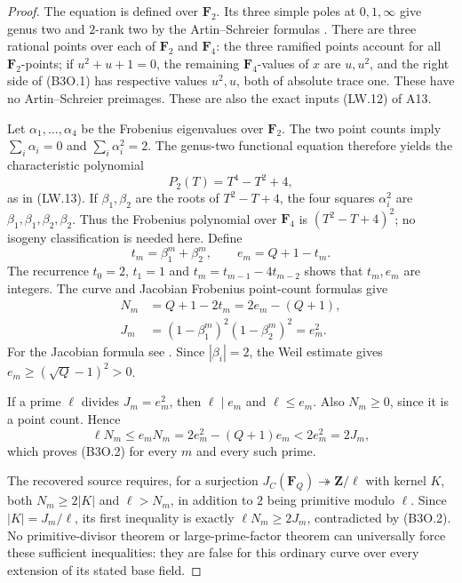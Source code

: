 \begin{proof}
The equation is defined over $\mathbf F_2$.  Its three simple
poles at $0,1,\infty$ give genus two and $2$-rank two by the
Artin--Schreier formulas \cite[Lemma~2.6]{PriesZhu2012}.
There are three rational points over each of $\mathbf F_2$
and $\mathbf F_4$: the three ramified points account for all
$\mathbf F_2$-points; if $u^2+u+1=0$, the remaining
$\mathbf F_4$-values of $x$ are $u,u^2$, and the right side
of (B3O.1) has respective values $u^2,u$, both of absolute
trace one.  These have no Artin--Schreier preimages.
These are also the exact inputs (LW.12) of A13.

Let $\alpha_1,\ldots,\alpha_4$ be the Frobenius eigenvalues
over $\mathbf F_2$.  The two point counts imply
$\sum_i\alpha_i=0$ and $\sum_i\alpha_i^2=2$.
The genus-two functional equation therefore yields the
characteristic polynomial
\[
                         P_2(T)=T^4-T^2+4,
 \tag{B3O.3}
\]
as in (LW.13).  If $\beta_1,\beta_2$ are the roots of
$T^2-T+4$, the four squares $\alpha_i^2$ are
$\beta_1,\beta_1,\beta_2,\beta_2$.
Thus the Frobenius polynomial over $\mathbf F_4$ is
$(T^2-T+4)^2$; no isogeny classification is needed here.
Define
\[
 t_m=\beta_1^m+\beta_2^m,\qquad e_m=Q+1-t_m.
 \tag{B3O.4}
\]
The recurrence $t_0=2$, $t_1=1$ and
$t_m=t_{m-1}-4t_{m-2}$ shows that $t_m,e_m$ are integers.
The curve and Jacobian Frobenius point-count formulas give
\[
 \begin{aligned}
 N_m&=Q+1-2t_m=2e_m-(Q+1),\\
 J_m&=(1-\beta_1^m)^2(1-\beta_2^m)^2=e_m^2.
 \end{aligned}
 \tag{B3O.5}
\]
For the Jacobian formula see
\cite[Theorem~19.1(b)]{MilneAV}.
Since $|\beta_i|=2$, the Weil estimate gives
$e_m\ge(\sqrt Q-1)^2>0$.

If a prime $\ell$ divides $J_m=e_m^2$, then
$\ell\mid e_m$ and $\ell\le e_m$.
Also $N_m\ge0$, since it is a point count.  Hence
\[
 \ell N_m\le e_mN_m
       =2e_m^2-(Q+1)e_m
       <2e_m^2=2J_m,
 \tag{B3O.6}
\]
which proves (B3O.2) for every $m$ and every such prime.

The recovered source \cite[B.3, formula~(B.CL.2)]{A1run}
requires, for a surjection
$J_C(\mathbf F_Q)\twoheadrightarrow\mathbf Z/\ell$
with kernel $K$, both $N_m\ge2|K|$ and $\ell>N_m$,
in addition to $2$ being primitive modulo $\ell$.
Since $|K|=J_m/\ell$, its first inequality is exactly
$\ell N_m\ge2J_m$, contradicted by (B3O.2).
No primitive-divisor theorem or large-prime-factor theorem
can universally force these sufficient inequalities:
they are false for this ordinary curve over every extension
of its stated base field.


\end{proof}

